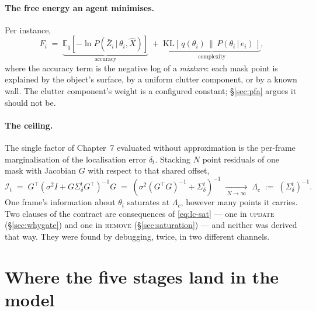 \documentclass[11pt,a4paper]{report}
\newcommand{\given}{\,|\,}
\newcommand{\stage}[1]{\textsc{#1}}
\newcommand{\Update}{\stage{update}}
\newcommand{\Remove}{\stage{remove}}
\begin{document}
\paragraph{The free energy an agent minimises.} Per instance,
\begin{equation}
F_i\;=\;
\underbrace{\mathbb{E}_{q}\!\left[-\ln P\!\left(\bar Z_i\given\theta_i,\hat X\right)\right]}_{\text{accuracy}}
\;+\;
\underbrace{\mathrm{KL}\!\left[\,q(\theta_i)\,\|\,P(\theta_i\given e_i)\,\right]}_{\text{complexity}} ,
\label{eq:lc-F}
\end{equation}
where the accuracy term is the negative log of a \emph{mixture}: each mask point is explained by the
object's surface, by a uniform clutter component, or by a known wall. The clutter component's weight
is a configured constant; \S\ref{sec:pfa} argues it should not be.

\paragraph{The ceiling.} The single factor of Chapter~7 evaluated without approximation is the
per-frame marginalisation of the localisation error $\delta_t$. Stacking $N$ point residuals of one
mask with Jacobian $G$ with respect to that shared offset,
\begin{equation}
\mathcal{I}_t \;=\; G^{\!\top}\!\left(\sigma^2 I+G\Sigma_\delta^t G^{\!\top}\right)^{-1}\!G
\;=\;
\left(\sigma^2\left(G^{\!\top}G\right)^{-1}+\Sigma_\delta^t\right)^{-1}
\;\xrightarrow[\ N\to\infty\ ]{}\;
\Lambda_c \;:=\; \left(\Sigma_\delta^t\right)^{-1}.
\label{eq:lc-sat}
\end{equation}
One frame's information about $\theta_i$ saturates at $\Lambda_c$, however many points it carries.
Two clauses of the contract are consequences of \eqref{eq:lc-sat} --- one in \Update{}
(\S\ref{sec:whygate}) and one in \Remove{} (\S\ref{sec:saturation}) --- and neither was derived that
way. They were found by debugging, twice, in two different channels.

\section{Where the five stages land in the model}
\label{sec:mapping}
\end{document}
